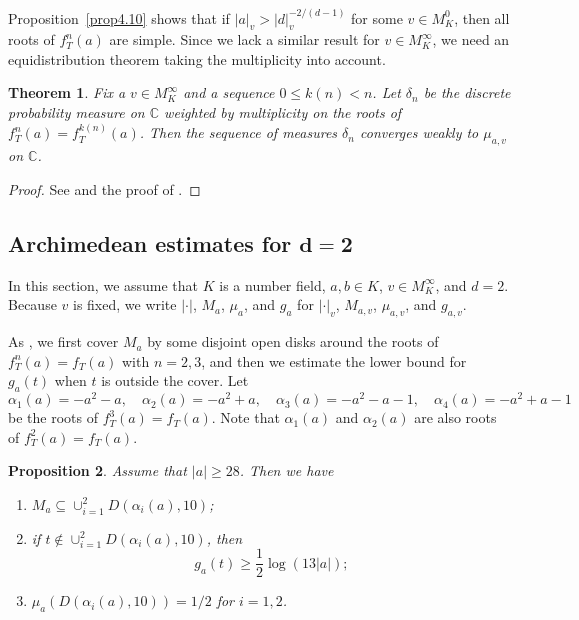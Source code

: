 \documentclass[10pt,a4paper]{amsart}
\numberwithin{equation}{section}
\theoremstyle{plain}
\newtheorem{thm}{Theorem}[section]
\newtheorem{prop}[thm]{Proposition}
\theoremstyle{definition}
\theoremstyle{remark}
\newcommand{\C}{\mathbb C}
\begin{document}
Proposition~\ref{prop4.10} shows that if $|a|_{v}>|d|_{v}^{-2/(d-1)}$
for some $v\in M_{K}^{0}$, then all roots of $f_{T}^{n}(a)$ are
simple. Since we lack a similar result for $v\in M_{K}^{\infty}$,
we need an equidistribution theorem taking the multiplicity into account.

\begin{thm}\label{thm4.3}
Fix a $v\in M_{K}^{\infty}$ and a sequence $0\leq k(n)<n$.
Let $\delta_{n}$ be the discrete probability measure on $\C$
weighted by multiplicity on the roots of $f_{T}^{n}(a)=f_{T}^{k(n)}(a)$.
Then the sequence of measures $\delta_{n}$ converges weakly to $\mu_{a,v}$
on $\C$.
\end{thm}

\begin{proof}
See \cite[Section 4.3]{BD1} and the proof of \cite[Theorem 1]{DF}.
\end{proof}

\subsection{Archimedean estimates for \texorpdfstring{$\boldsymbol{d=2}$}{$d=2$}}\label{sec4.2}

In this section, we assume that $K$ is a number field, $a,b\in K$,
$v\in M_{K}^{\infty}$, and $d=2$. Because $v$ is fixed, we write
$|\cdot|$, $M_{a}$, $\mu_{a}$, and $g_{a}$ for $|\cdot|_{v}$,
$M_{a,v}$, $\mu_{a,v}$, and $g_{a,v}$.

As \cite[Section 3.2]{DKY2}, we first cover $M_{a}$ by some disjoint
open disks around the roots of $f_{T}^{n}(a)=f_{T}(a)$ with $n=2,3$,
and then we estimate the lower bound for $g_{a}(t)$ when $t$ is outside
the cover. Let
\[
\alpha_{1}(a)=-a^{2}-a,\quad\alpha_{2}(a)=-a^{2}+a,\quad\alpha_{3}(a)=-a^{2}-a-1,\quad\alpha_{4}(a)=-a^{2}+a-1
\]
be the roots of $f_{T}^{3}(a)=f_{T}(a)$. Note that $\alpha_{1}(a)$
and $\alpha_{2}(a)$ are also roots of $f_{T}^{2}(a)=f_{T}(a)$.

\begin{prop}\label{prop4.4}
  Assume that $|a|\geq28$. Then we have
\begin{enumerate}
\item\label{p4.4-1} $M_{a}\subseteq\cup_{i=1}^{2}D(\alpha_{i}(a),10)$; 
\item\label{p4.4-2} if $t\notin\cup_{i=1}^{2}D(\alpha_{i}(a),10)$, then
\[
g_{a}(t)\geq\frac{1}{2}\log(13|a|);
\]
\item\label{p4.4-3} $\mu_{a}(D(\alpha_{i}(a),10))=1/2$ for $i=1,2$.
\end{enumerate}
\end{prop}
\end{document}
